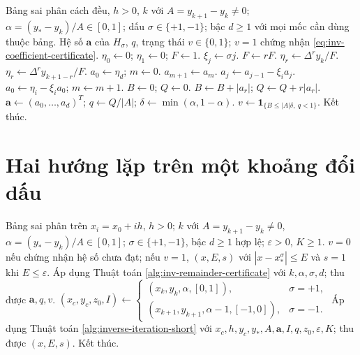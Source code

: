\documentclass[12pt,a4paper,oneside]{book}
\numberwithin{algorithm}{chapter}
\theoremstyle{definition}
\begin{document}
\begin{algorithm}[H]
\caption{Phần dư Newton tiến hoặc lùi và chứng nhận co -- chi tiết}
\label{alg:inv-remainder-certificate-detailed}
\small
\begin{algorithmic}[1]
\Require Bảng sai phân cách đều, $h>0$, $k$ với $A=y_{k+1}-y_k\ne0$; $\alpha=(y_\ast-y_k)/A\in[0,1]$; dấu $\sigma\in\{+1,-1\}$; bậc $d\geq1$ với mọi mốc cần dùng thuộc bảng.
\Ensure Hệ số $\boldsymbol a$ của $H_\sigma$, $q$, trạng thái $v\in\{0,1\}$; $v=1$ chứng nhận \eqref{eq:inv-coefficient-certificate}.
\State $\eta_0\gets0$; $\eta_1\gets0$; $F\gets1$.
  \State $\xi_j\gets\sigma j$.
\EndFor
\Statex
{}
  \State $F\gets rF$.
    \State $\eta_r\gets\Delta^ry_k/F$.
  \Else
    \State $\eta_r\gets\Delta^ry_{k+1-r}/F$.
  \EndIf
  \Statex
\EndFor
\Statex
\State $a_0\gets\eta_d$; $m\gets0$.
  \State $a_{m+1}\gets a_m$.
    \State $a_j\gets a_{j-1}-\xi_i a_j$.
  \EndFor
  \Statex
  \State $a_0\gets\eta_i-\xi_i a_0$; $m\gets m+1$.
\EndFor
\Statex
\State $B\gets0$; $Q\gets0$.
  \State $B\gets B+|a_r|$; $Q\gets Q+r|a_r|$.
\EndFor
\Statex
\State $\boldsymbol a\gets(a_0,\ldots,a_d)^T$; $q\gets Q/|A|$; $\delta\gets\min(\alpha,1-\alpha)$.
\State $v\gets\mathbf1_{\{B\leq|A|\delta,\ q<1\}}$.
\State Kết thúc.
\end{algorithmic}
\end{algorithm}

\section{Hai hướng lặp trên một khoảng đổi dấu}
\begin{algorithm}[H]
\caption{Nội suy ngược theo hướng tiến hoặc lùi -- sơ lược}
\label{alg:inv-two-directions}
\begin{algorithmic}[1]
\Require Bảng sai phân trên $x_i=x_0+ih$, $h>0$; $k$ với $A=y_{k+1}-y_k\ne0$, $\alpha=(y_\ast-y_k)/A\in[0,1]$; $\sigma\in\{+1,-1\}$, bậc $d\geq1$ hợp lệ; $\varepsilon>0$, $K\geq1$.
\Ensure $v=0$ nếu chứng nhận hệ số chưa đạt; nếu $v=1$, $(x,E,s)$ với $|x-x_*^\sigma|\leq E$ và $s=1$ khi $E\leq\varepsilon$.
\State Áp dụng Thuật toán \ref{alg:inv-remainder-certificate} với $k,\alpha,\sigma,d$; thu được $\boldsymbol a,q,v$.
  \State $(x_c,y_c,z_0,I)\gets\begin{cases}(x_k,y_k,\alpha,[0,1]),&\sigma=+1,\\(x_{k+1},y_{k+1},\alpha-1,[-1,0]),&\sigma=-1.\end{cases}$
  \State Áp dụng Thuật toán \ref{alg:inverse-iteration-short} với $x_c,h,y_c,y_\ast,A,\boldsymbol a,I,q,z_0,\varepsilon,K$; thu được $(x,E,s)$.
\EndIf
\Statex
\State Kết thúc.
\end{algorithmic}
\end{algorithm}
\end{document}
